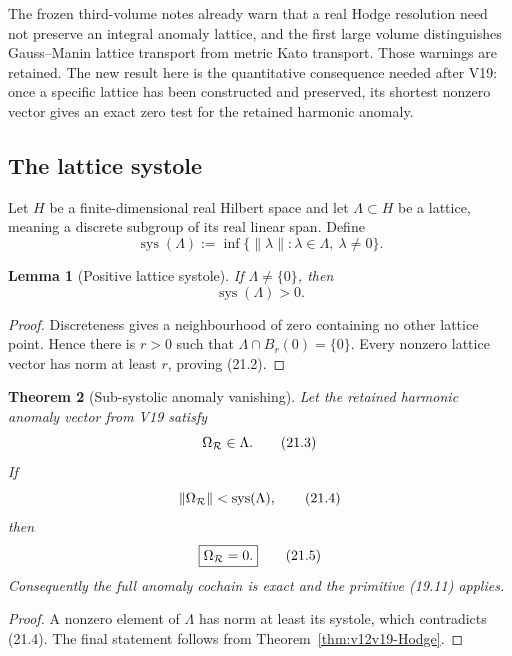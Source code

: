 \documentclass[11pt]{article}
\newtheorem{theorem}{Theorem}[section]
\newtheorem{lemma}[theorem]{Lemma}
\theoremstyle{remark}
\begin{document}
The frozen third-volume notes already warn that a real Hodge
resolution need not preserve an integral anomaly lattice, and the
first large volume distinguishes Gauss--Manin lattice transport from
metric Kato transport.  Those warnings are retained.  The new result
here is the quantitative consequence needed after V19: once a
specific lattice has been constructed and preserved, its shortest
nonzero vector gives an exact zero test for the retained harmonic
anomaly.

\subsection{The lattice systole}

Let \(H\) be a finite-dimensional real Hilbert space and let
\(\Lambda\subset H\) be a lattice, meaning a discrete subgroup of its
real linear span.  Define
\[
 \operatorname{sys}(\Lambda)
 :=
 \inf\{\|\lambda\|:\lambda\in\Lambda,\ \lambda\ne0\}.        \tag{21.1}
\]

\begin{lemma}[Positive lattice systole]
\label{lem:v12v21-systole}
If \(\Lambda\ne\{0\}\), then
\[
                         \operatorname{sys}(\Lambda)>0.     \tag{21.2}
\]
\end{lemma}

\begin{proof}
Discreteness gives a neighbourhood of zero containing no other
lattice point.  Hence there is \(r>0\) such that
\(\Lambda\cap B_r(0)=\{0\}\).  Every nonzero lattice vector has norm
at least \(r\), proving (21.2).
\end{proof}

\begin{theorem}[Sub-systolic anomaly vanishing]
\label{thm:v12v21-zero}
Let the retained harmonic anomaly vector from V19 satisfy
\[
                         \Omega_{\cal R}\in\Lambda.          \tag{21.3}
\]
If
\[
                         \|\Omega_{\cal R}\|
 <\operatorname{sys}(\Lambda),                             \tag{21.4}
\]
then
\[
                         \boxed{\Omega_{\cal R}=0.}         \tag{21.5}
\]
Consequently the full anomaly cochain is exact and the primitive
(19.11) applies.
\end{theorem}

\begin{proof}
A nonzero element of \(\Lambda\) has norm at least its systole, which
contradicts (21.4).  The final statement follows from
Theorem~\ref{thm:v12v19-Hodge}.
\end{proof}
\end{document}
